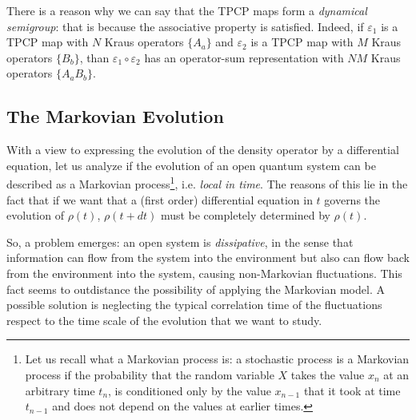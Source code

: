 There is a reason why we can say that the TPCP maps form a \emph{dynamical semigroup}: that is because the associative property is satisfied. Indeed, if $\varepsilon_1$ is a TPCP map with $N$ Kraus operators $\{A_a\}$ and $\varepsilon_2$ is a TPCP map with $M$ Kraus operators $\{B_b\}$, than $\varepsilon_1 \circ \varepsilon_2$ has an operator-sum representation with $NM$ Kraus operators $\{A_aB_b\}$.

\subsection{The Markovian Evolution}
With a view to expressing the evolution of the density operator by a differential equation,  let us analyze if the evolution of an open quantum system can be described as a Markovian process\footnote{Let us recall what a Markovian process is: a stochastic process is a Markovian process if the probability that the random variable $X$ takes the value $x_n$ at an arbitrary time $t_n$, is conditioned only by the value $x_{n-1}$ that it took at time $t_{n-1}$ and does not depend on the values at earlier times.}, i.e. \emph{local in time}. The reasons of this lie in the fact that if we want that a (first order) differential equation in $t$ governs the evolution of $\rho(t)$, $\rho(t+dt)$ must be completely determined by $\rho(t)$.

So, a problem emerges: an open system is \emph{dissipative}, in the sense that information can flow from the system into the environment but also can flow back from the environment into the system, causing non-Markovian fluctuations. This fact seems to outdistance the possibility of applying the Markovian model.  A possible solution is neglecting the typical correlation time of the fluctuations respect to the time scale of the evolution that we want to study.

